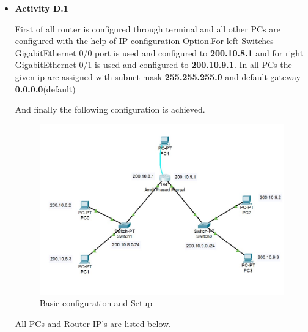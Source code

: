 \documentclass[12pt]{article}
\begin{document}
\begin{itemize}
      \item \textbf{Activity D.1}

            First of all router is configured through terminal and all other PCs are configured with the help of IP configuration Option.For left  Switches GigabitEthernet 0/0 port is used and configured to \textbf{200.10.8.1} and for right GigabitEthernet 0/1 is used and configured to \textbf{200.10.9.1}. In all PCs the given ip are assigned with subnet mask \textbf{255.255.255.0} and default gateway \textbf{0.0.0.0}(default)


            And finally the following configuration is achieved.
            \begin{figure}[H]
                  \centering
                  \includegraphics[scale=0.75,cframe=blue 0.5pt 3pt]{basic config.jpg}
                  \caption{Basic configuration and Setup}
            \end{figure}
            All PCs and Router IP's are listed below.


\end{itemize}
\end{document}
